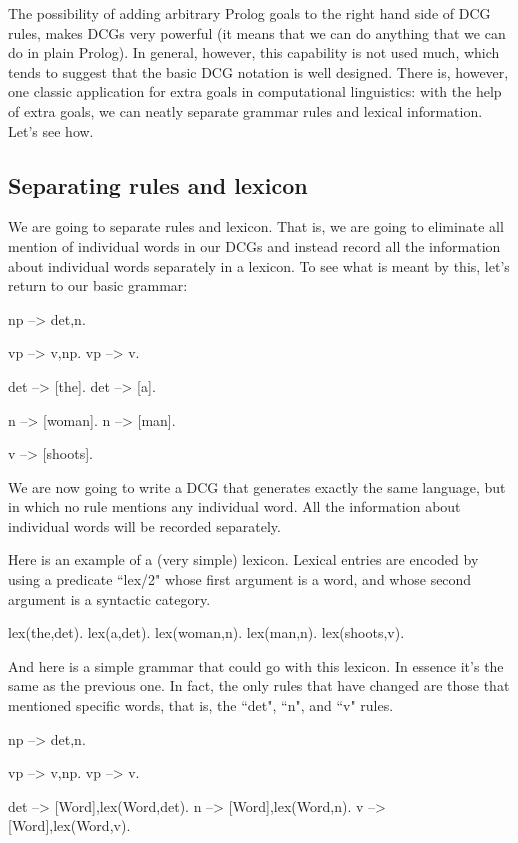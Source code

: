 The possibility of adding arbitrary Prolog goals to the right hand
side of DCG rules, makes DCGs very powerful (it means that we can do
anything that we can do in plain Prolog). In general, however, this
capability is not used much, which tends to suggest that the basic DCG
notation is well designed.  There is, however, one classic application
for extra goals in computational linguistics: with the help of extra
goals, we can neatly separate grammar rules and lexical
information. Let's see how.

\subsection*{Separating rules and lexicon}\label{SUBSEC.L8.SEP.RULE.LEX}


We are going to separate rules and lexicon. That is, we are going to
eliminate all mention of individual words in our DCGs and instead
record all the information about individual words separately in a
lexicon.  To see what is meant by this, let's return to our basic
grammar:
\begin{LPNcodedisplay}
np --> det,n.

vp --> v,np.
vp --> v.

det --> [the].
det --> [a].

n --> [woman].
n --> [man].

v --> [shoots].
\end{LPNcodedisplay}
We are now going to write a DCG that generates exactly
the same language, but in which no rule mentions any individual
word. All the information about individual words will be recorded
separately.


Here is an example of a (very simple) lexicon. Lexical entries are
encoded by using a predicate ``lex/2" whose first argument is a
word, and whose second argument is a syntactic category.
\begin{LPNcodedisplay}
lex(the,det).
lex(a,det).
lex(woman,n).
lex(man,n).
lex(shoots,v).
\end{LPNcodedisplay}

And here is a simple grammar that could go with this lexicon.  In
essence it's the same as the previous one.  In fact, the only rules
that have changed are those that mentioned specific words, that is,
the ``det", ``n", and ``v" rules.
\begin{LPNcodedisplay}
np --> det,n.

vp --> v,np.
vp --> v.

det --> [Word],{lex(Word,det)}.
n --> [Word],{lex(Word,n)}.
v --> [Word],{lex(Word,v)}.
\end{LPNcodedisplay}

